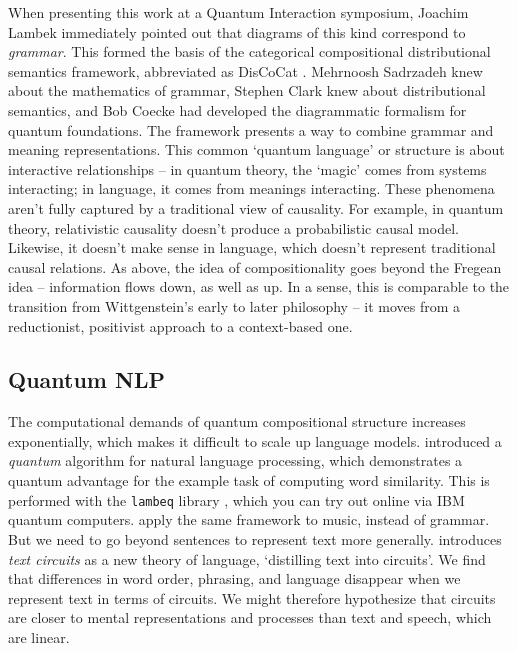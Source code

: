 When presenting this work at a Quantum Interaction symposium, Joachim Lambek
immediately pointed out that diagrams of this kind correspond to \emph{grammar}.
This formed the basis of the categorical compositional distributional semantics
framework, abbreviated as DisCoCat \parencites{Clark2008}{Coecke2010}.
Mehrnoosh Sadrzadeh knew about the mathematics of grammar, Stephen Clark knew about
distributional semantics, and Bob Coecke had developed the diagrammatic formalism for
quantum foundations.
The framework presents a way to combine grammar and meaning representations.
This common `quantum language' or structure is about interactive relationships -- in
quantum theory, the `magic' comes from systems interacting; in language, it comes from
meanings interacting.
These phenomena aren't fully captured by a traditional view of causality.
For example, in quantum theory, relativistic causality doesn't produce a probabilistic
causal model.
Likewise, it doesn't make sense in language, which doesn't represent traditional causal
relations.
As above, the idea of compositionality goes beyond the Fregean idea -- information
flows down, as well as up.
In a sense, this is comparable to the transition from Wittgenstein's early to later
philosophy -- it moves from a reductionist, positivist approach to a context-based one.

\subsection*{Quantum NLP}

The computational demands of quantum compositional structure increases exponentially,
which makes it difficult to scale up language models.
 \parencites*{Zeng2016} introduced a \emph{quantum} algorithm for
natural language processing, which demonstrates a quantum advantage for the example
task of computing word similarity.
This is performed with the \texttt{lambeq} library \parencites{Kartsaklis2021}, which
you can try out online via IBM quantum computers.
\textcites{Miranda2021} apply the same framework to music, instead of grammar.
But we need to go beyond sentences to represent text more generally.
 \parencites{Coecke2020} introduces \emph{text circuits} as a new
theory of language, `distilling text into circuits'.
We find that differences in word order, phrasing, and language disappear when we
represent text in terms of circuits.
We might therefore hypothesize that circuits are closer to mental representations and
processes than text and speech, which are linear.

